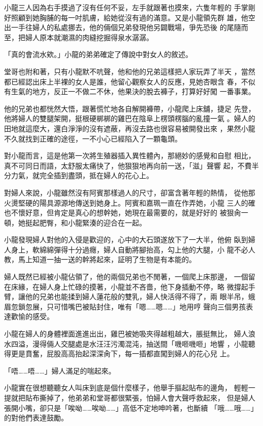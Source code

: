 小龍三人因為右手摸過了沒有任何不妥，左手就跟著也摸來，六隻年輕的
手掌剛好照顧到她胸脯的每一吋肌膚，給她從沒有過的滿意。又是小龍領先群
雄，他空出一手往婦人的私處挪去，他的倆個兄弟發現他另闢戰場，爭先恐後
的尾隨而至，把婦人原本就潮濕的肉縫挖掘得泉水潺潺。

「真的會流水欸。」小龍的弟弟確定了傳說中對女人的敘述。

堂哥也附和著，只有小龍默不吭聲，他和他的兄弟這樣把人家玩弄了半天
，當然都已經認出床上半裸的女人是誰，他留心觀察女人的反應，見她杏眼含
春，不似有生氣的地方，反正一不做二不休，他果決的脫去褲子，打算好好闖
一番事業。

他的兄弟也都恍然大悟，跟著慌忙地各自解開褲帶，小龍爬上床舖，捷足
先登，他將婦人的雙腿架開，挺根硬梆梆的雞巴在陰阜上楞頭楞腦的亂撞一氣
。婦人的田地就這麼大，還白淨淨的沒有遮蔽，再沒去路也很容易被開發出來
，果然小龍不久就找到正確的途徑，一不小心已經陷入了一顆龜頭。

對小龍而言，這是他第一次將生殖器插入異性體內，那絕妙的感覺和自慰
相比，真不可同日而語，太舒服太痛快了，他狠狠地再向前一送，「滋」聲響
起，不費半分力氣，就完全插到盡頭，抵在婦人的花心上。

對婦人來說，小龍雖然沒有阿賓那樣過人的尺寸，卻富含著年輕的熱情，
從他那火燙堅硬的陽具源源地傳送到她身上。阿賓和嘉珮一直在作弄她，小龍
三人的確也不懷好意，但肯定是真心的想幹她，她現在最需要的，就是好好的
被狠肏一頓，她挺起肥臀，和小龍緊湊的迎合在一起。

小龍發現婦人對他的入侵是歡迎的，心中的大石頭遂放下了一大半，他俯
臥到婦人身上，軟綿綿彈得十分過癮，婦人自動將腳抬高，勾上他的大腿，小
龍不必人教，馬上知道一抽一送的幹將起來，証明了生物是有本能的。

婦人既然已經被小龍佔領了，他的兩個兄弟也不閒著，一個爬上床那邊，
一個留在床緣，在婦人身上忙碌的摸著，小龍並不吝嗇，他下身插動不停，略
微撐起手臂，讓他的兄弟也能揉到婦人蓮花般的雙乳，婦人快活得不得了，兩
眼半吊，蛾眉忽鎖忽展，只可惜嘴巴被貼封住，唯有「嗯……嗯……」地用哼
聲向三個男孩表達歡愉的感受。

小龍在婦人的身體裡面進進出出，雞巴被她吸夾得越粗越大，脹挺無比，
婦人浪水四溢，漫得倆人交腿處是水汪汪污濁混沌，抽送間「嘰咂嘰咂」地響
，小龍聽得更是賁奮，屁股高高抬起深深肏下，每一插都直闖到婦人的花心兒
上。

「唔……唔……」婦人滿足的喘起來。

小龍實在很想聽聽女人叫床到底是個什麼樣子，他舉手摳起貼布的邊角，
輕輕一提就把貼布撕掉了，他弟弟和堂哥都很緊張，怕婦人會大聲呼救起來，
但是婦人張開小嘴，卻只是「唉呦……唉呦……」高低不定地呻吟著，也斷續
「哦……哦……」的對他們表達鼓勵。

